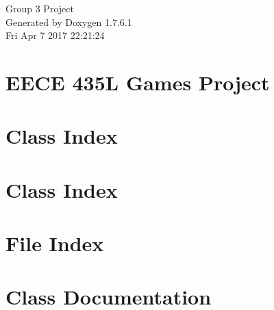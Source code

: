 \documentclass[a4paper]{book}
\begin{document}
\hypersetup{pageanchor=false,citecolor=blue}
\begin{titlepage}
\vspace*{7cm}
\begin{center}
{\Large \-Group 3 \-Project }\\
\vspace*{1cm}
{\large \-Generated by Doxygen 1.7.6.1}\\
\vspace*{0.5cm}
{\small Fri Apr 7 2017 22:21:24}\\
\end{center}
\end{titlepage}
\clearemptydoublepage
{}
\tableofcontents
\clearemptydoublepage
{}
\hypersetup{pageanchor=true,citecolor=blue}
\chapter{\-E\-E\-C\-E 435\-L \-Games \-Project}
\label{index}\hypertarget{index}{}
\chapter{\-Class \-Index}

\chapter{\-Class \-Index}

\chapter{\-File \-Index}

\chapter{\-Class \-Documentation}


























\end{document}
